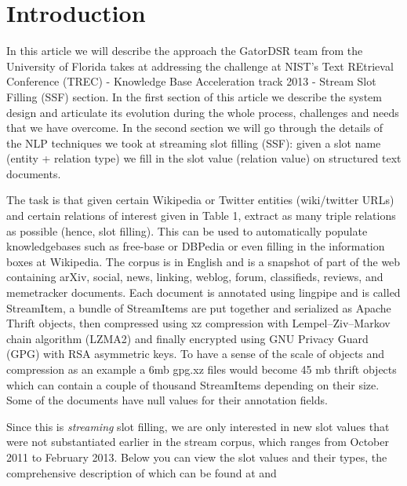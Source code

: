 
\section{Introduction}

In this article we will describe the approach the GatorDSR team from the University of Florida takes at addressing the challenge at NIST’s Text REtrieval Conference (TREC) - Knowledge Base Acceleration track 2013 - Stream Slot Filling (SSF) section. In the first section of this article we describe the system design and articulate its evolution during the whole process, challenges and needs that we have overcome. In the second section we will go through the details of the NLP techniques we took at streaming slot filling (SSF): given a slot name (entity + relation type) we fill in the slot value (relation value) on structured text documents.

The task is that given certain Wikipedia or Twitter entities (wiki/twitter URLs) and certain relations of interest given in Table 1, extract as many triple relations as possible (hence, slot filling). This can be used to automatically populate knowledgebases such as free-base or DBPedia or even filling in the information boxes at Wikipedia. The corpus is in English and is a snapshot of part of the web containing arXiv, social, news, linking, weblog, forum, classifieds, reviews, and memetracker documents. Each document is annotated using lingpipe and is called StreamItem, a bundle of StreamItems are put together and serialized as Apache Thrift objects, then compressed using xz compression with Lempel–Ziv–Markov chain algorithm (LZMA2) and finally encrypted using GNU Privacy Guard (GPG) with RSA asymmetric keys. To have a sense of the scale of objects and compression as an example a 6mb gpg.xz files would become 45 mb thrift objects which can contain a couple of thousand StreamItems depending on their size. Some of the documents have null values for their annotation fields.

Since this is \textit{streaming} slot filling, we are only interested in new slot values that were not substantiated earlier in the stream corpus, which ranges from October 2011 to February 2013. Below you can view the slot values and their types, the comprehensive description of which can be found at \cite{tackbp} and \cite{aec} 

